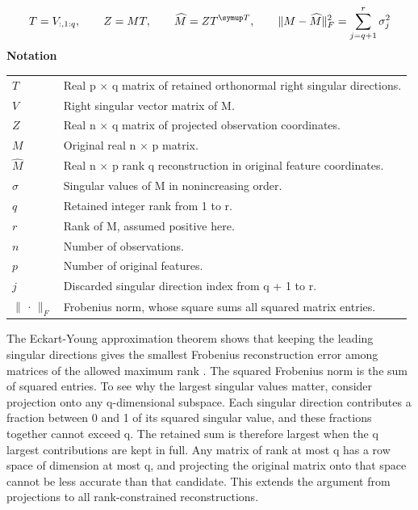 \documentclass[10pt,letterpaper]{article}
\newcommand{\notlabel}{\noindent\textbf{Notation}\par\nobreak\vspace{4pt}}
\begin{document}
\par\noindent\begin{minipage}{\linewidth}
\begin{equation}\label{eq:truncation}
T=V_{:,1:q},\qquad Z=MT,\qquad \widehat M=ZT^{\symup T},\qquad\lVert M-\widehat M\rVert_F^2=\sum_{j=q+1}^{r}\sigma_j^2
\end{equation}
\notlabel
{\fontsize{8.5}{10.5}\selectfont\setlength{\tabcolsep}{0pt}\renewcommand{\arraystretch}{1.12}
\begin{tabularx}{\linewidth}{@{}p{.14\linewidth}X@{}}
$T$ & Real p \ensuremath{\times} q matrix of retained orthonormal right singular directions.\\
$V$ & Right singular vector matrix of M.\\
$Z$ & Real n \ensuremath{\times} q matrix of projected observation coordinates.\\
$M$ & Original real n \ensuremath{\times} p matrix.\\
$\widehat M$ & Real n \ensuremath{\times} p rank q reconstruction in original feature coordinates.\\
$\sigma$ & Singular values of M in nonincreasing order.\\
$q$ & Retained integer rank from 1 to r.\\
$r$ & Rank of M, assumed positive here.\\
$n$ & Number of observations.\\
$p$ & Number of original features.\\
$j$ & Discarded singular direction index from q + 1 to r.\\
$\lVert\,\cdot\,\rVert_F$ & Frobenius norm, whose square sums all squared matrix entries.\\
\end{tabularx}}
\par\vspace{2pt}
\end{minipage}\par
The Eckart-Young approximation theorem shows that keeping the leading singular directions gives the smallest Frobenius reconstruction error among matrices of the allowed maximum rank \cite{eckart}. The squared Frobenius norm is the sum of squared entries. To see why the largest singular values matter, consider projection onto any q-dimensional subspace. Each singular direction contributes a fraction between 0 and 1 of its squared singular value, and these fractions together cannot exceed q. The retained sum is therefore largest when the q largest contributions are kept in full. Any matrix of rank at most q has a row space of dimension at most q, and projecting the original matrix onto that space cannot be less accurate than that candidate. This extends the argument from projections to all rank-constrained reconstructions.\par
\end{document}
